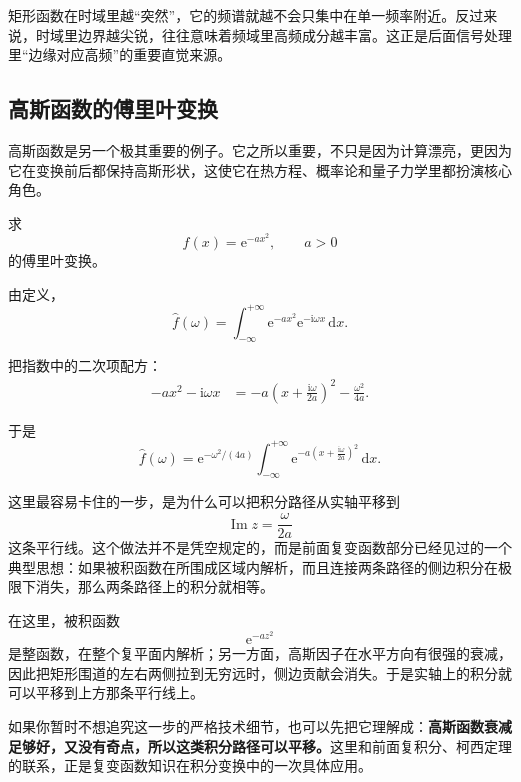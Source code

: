 \begin{tishi}[这个例子告诉我们什么]
矩形函数在时域里越``突然''，它的频谱就越不会只集中在单一频率附近。反过来说，时域里边界越尖锐，往往意味着频域里高频成分越丰富。这正是后面信号处理里``边缘对应高频''的重要直觉来源。
\end{tishi}

\subsection{高斯函数的傅里叶变换}

高斯函数是另一个极其重要的例子。它之所以重要，不只是因为计算漂亮，更因为它在变换前后都保持高斯形状，这使它在热方程、概率论和量子力学里都扮演核心角色。

\begin{lizi}{}{}
求
\begin{equation}
    f(x)=\mathrm{e}^{-ax^2}, \qquad a>0
\end{equation}
的傅里叶变换。

\begin{jie}
由定义，
\begin{equation}
    \hat{f}(\omega)
    =
    \int_{-\infty}^{+\infty}
    \mathrm{e}^{-ax^2}\mathrm{e}^{-\mathrm{i}\omega x}\,\mathrm{d}x.
\end{equation}

把指数中的二次项配方：
\begin{align}
    -ax^2-\mathrm{i}\omega x
    &=
    -a\left(x+\frac{\mathrm{i}\omega}{2a}\right)^2-\frac{\omega^2}{4a}.
\end{align}

于是
\begin{equation}
    \hat{f}(\omega)
    =
    \mathrm{e}^{-\omega^2/(4a)}
    \int_{-\infty}^{+\infty}
    \mathrm{e}^{-a\left(x+\frac{\mathrm{i}\omega}{2a}\right)^2}\,\mathrm{d}x.
\end{equation}

这里最容易卡住的一步，是为什么可以把积分路径从实轴平移到
\[
    \operatorname{Im} z=\frac{\omega}{2a}
\]
这条平行线。这个做法并不是凭空规定的，而是前面复变函数部分已经见过的一个典型思想：如果被积函数在所围成区域内解析，而且连接两条路径的侧边积分在极限下消失，那么两条路径上的积分就相等。

在这里，被积函数
\[
    \mathrm{e}^{-az^2}
\]
是整函数，在整个复平面内解析；另一方面，高斯因子在水平方向有很强的衰减，因此把矩形围道的左右两侧拉到无穷远时，侧边贡献会消失。于是实轴上的积分就可以平移到上方那条平行线上。

如果你暂时不想追究这一步的严格技术细节，也可以先把它理解成：\textbf{高斯函数衰减足够好，又没有奇点，所以这类积分路径可以平移。}这里和前面复积分、柯西定理的联系，正是复变函数知识在积分变换中的一次具体应用。


\end{jie}
\end{lizi}
